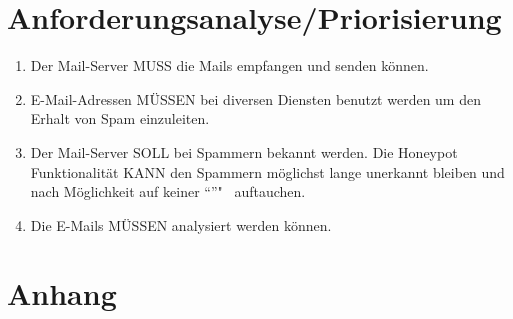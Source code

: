 \documentclass[a4paper,11pt,singlespacing]{article}
\begin{document}
\section{Anforderungsanalyse/Priorisierung}\label{sec:AnforderungsanalysePriorisierung}
	\begin{enumerate}
	\item Der Mail-Server MUSS die Mails empfangen und senden können. %
	\item E-Mail-Adressen MÜSSEN bei diversen Diensten benutzt werden um den Erhalt von Spam einzuleiten. %
	\item Der Mail-Server SOLL bei Spammern bekannt werden. Die Honeypot Funktionalität KANN den Spammern möglichst lange unerkannt bleiben und nach Möglichkeit auf keiner "`"'"~ auftauchen. %
	\item Die E-Mails MÜSSEN analysiert werden können.
	\end{enumerate}


%
%
%
%
%
%


\newpage




\listoffigures
{}

\lstlistoflistings
{}

\newpage

\section*{Anhang}\label{Anhang}

%
\end{document}
